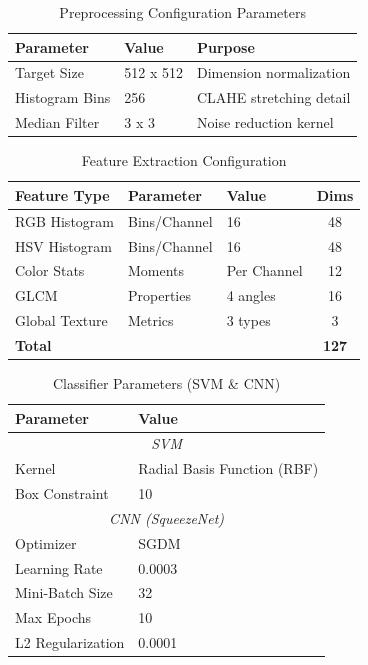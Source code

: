 \documentclass[conference, a4paper]{IEEEtran}
\begin{document}
\begin{table}[!t]
\caption{Preprocessing Configuration Parameters}
\begin{center}
\begin{tabular}{lll}
\toprule
\textbf{Parameter} & \textbf{Value} & \textbf{Purpose} \\
\midrule
Target Size & 512 x 512 & Dimension normalization \\
Histogram Bins & 256 & CLAHE stretching detail \\
Median Filter & 3 x 3 & Noise reduction kernel \\
\bottomrule
\end{tabular}
\label{tab:pre_params}
\end{center}
\end{table}

\begin{table}[!t]
\caption{Feature Extraction Configuration}
\begin{center}
\begin{tabular}{lllc}
\toprule
\textbf{Feature Type} & \textbf{Parameter} & \textbf{Value} & \textbf{Dims} \\
\midrule
RGB Histogram & Bins/Channel & 16 & 48 \\
HSV Histogram & Bins/Channel & 16 & 48 \\
Color Stats & Moments & Per Channel & 12 \\
GLCM & Properties & 4 angles & 16 \\
Global Texture & Metrics & 3 types & 3 \\
\textbf{Total} & & & \textbf{127} \\
\bottomrule
\end{tabular}
\label{tab:feat_config}
\end{center}
\end{table}

\begin{table}[!t]
\caption{Classifier Parameters (SVM \& CNN)}
\begin{center}
\begin{tabular}{ll}
\toprule
\textbf{Parameter} & \textbf{Value} \\
\midrule
\multicolumn{2}{c}{\textit{SVM}} \\
Kernel & Radial Basis Function (RBF) \\
Box Constraint & 10 \\
\midrule
\multicolumn{2}{c}{\textit{CNN (SqueezeNet)}} \\
Optimizer & SGDM \\
Learning Rate & 0.0003 \\
Mini-Batch Size & 32 \\
Max Epochs & 10 \\
L2 Regularization & 0.0001 \\
\bottomrule
\end{tabular}
\label{tab:svm_params}
\end{center}
\end{table}
\end{document}
